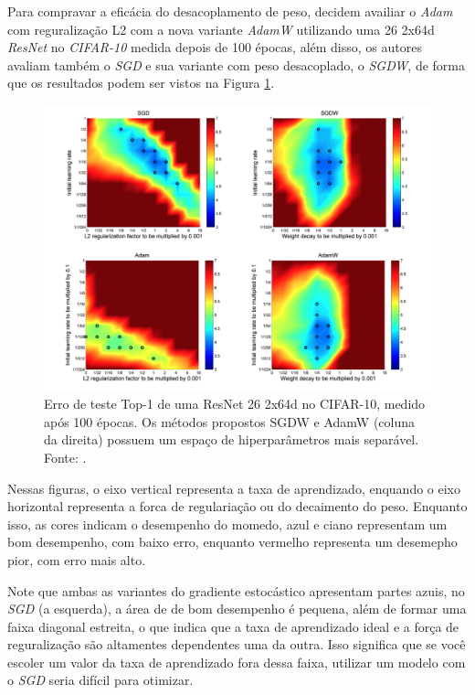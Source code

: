 Para compravar a eficácia do desacoplamento de peso, \textcite{AdamWMethod} decidem availiar o \textit{Adam} com reguralização L2 com a nova variante \textit{AdamW} utilizando uma 26 2x64d \textit{ResNet} no \textit{CIFAR-10} medida depois de 100 épocas, além disso, os autores avaliam também o \textit{SGD} e sua variante com peso desacoplado, o \textit{SGDW}, de forma que os resultados podem ser vistos na Figura \ref{fig:comparativo-adamw-cifar-10}.

\begin{figure}[h]
    \centering
    \includegraphics[width=1\linewidth]{../imagens/retropropagacao-gradiente/comparativo-adamw-cifar-10.png}
    
    \caption[Erro de teste Top-1 da ResNet no CIFAR-10]{%
        Erro de teste Top-1 de uma ResNet 26 2x64d no CIFAR-10, medido após 100 épocas. Os métodos propostos SGDW e AdamW (coluna da direita) possuem um espaço de hiperparâmetros mais separável.
        \newline
        \small Fonte: \parencite{AdamWMethod}.
    }
    \label{fig:comparativo-adamw-cifar-10}
\end{figure}

Nessas figuras, o eixo vertical representa a taxa de aprendizado, enquando o eixo horizontal representa a forca de regulariação ou do decaimento do peso. Enquanto isso, as cores indicam o desempenho do momedo, azul e ciano representam um bom desempenho, com baixo erro, enquanto vermelho representa um desemepho pior, com erro mais alto.

Note que ambas as variantes do gradiente estocástico apresentam partes azuis, no \textit{SGD} (a esquerda), a área de de bom desempenho é pequena, além de formar uma faixa diagonal estreita, o que indica que a taxa de aprendizado ideal e a força de reguralização são altamentes dependentes uma da outra. Isso significa que se você escoler um valor da taxa de aprendizado fora dessa faixa, utilizar um modelo com o \textit{SGD} seria difícil para otimizar.

